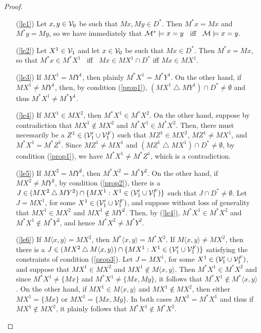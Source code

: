 \documentclass{fundam}
\begin{document}
\begin{proof}
\begin{itemize}
\item [(\ref{le1})] Let $x,y \in {\cal V}_{0}$ be such that $Mx, My
\in D^{*}$.  Then $M^{*}x = Mx$ and $M^{*}y = My$, so we have
immediately that ${\cal M}^{*} \models x = y$ ~iff~ ${\cal M} \models x
= y$.

\item [(\ref{le2})] Let $X^1 \in {\cal V}_{1}$ and let $x \in {\cal
V}_{0}$ be such that $Mx \in D^{*}$.  Then $M^{*}x = Mx$, so that
$M^{*}x \in M^{*}X^1$ ~iff~ $Mx \in MX^1 \cap D^{*}$ iff $Mx \in MX^1$.

\item [(\ref{le3})] If $MX^1 = MY^1$, then plainly $M^{*}X^1 =
M^{*}Y^1$.  On the other hand, if $MX^1 \neq MY^1$, then, by condition
(\ref{prop1}), $(MX^1 \bigtriangleup MY^1) \cap D^{*} \neq \emptyset$ and thus
$M^{*}X^1 \neq M^{*}Y^1$.

\item [(\ref{le4})] If $MX^1 \in MX^2$, then $M^*X^1 \in M^*X^2$.  On
the other hand, suppose by contradiction that $MX^1 \notin MX^2$ and
$M^*X^1 \in M^*X^2$.  Then, there must necessarily be a $Z^1 \in
({\cal V}_{1}' \cup {\cal V}_{1}^{F})$ such that $MZ^1 \in MX^2$,
$MZ^1 \neq MX^1$, and $M^* X^1 = M^* Z^1$.  Since $MZ^1 \neq MX^1$ and
$(MZ^1 \bigtriangleup MX^1) \cap D^{*} \neq \emptyset$, by condition
(\ref{prop1}), we have $M^* X^1 \neq M^* Z^1$, which is a
contradiction.

\item [(\ref{le5})] If $MX^2 = MY^2$, then $M^* X^2 = M^* Y^2$.  On
the other hand, if $MX^2 \neq MY^2$, by condition (\ref{prop2}), there
is a $J \in (MX^2 \bigtriangleup MY^2) \cap \{MX^1 : X^1 \in ({\cal
V}_{1}'\cup {\cal V}_{1}^{F})\}$ such that $J \cap D^* \neq
\emptyset$.  Let $J = MX^1$, for some $X^1 \in ({\cal V}_{1}'\cup
{\cal V}_{1}^{F})$, and suppose without loss of generality that $MX^1
\in MX^2$ and $MX^1 \notin MY^2$.  Then, by (\ref{le4}), $M^*X^1 \in
M^* X^2$ and $M^* X^1 \notin M^* Y^2$, and hence $M^* X^2 \neq M^*
Y^2$.

\item [(\ref{le6})] If $M\langle x,y \rangle = MX^2$, then $M^*
\langle x,y \rangle = M^* X^2$.  If $M\langle x,y \rangle \neq MX^2$,
then there is a $J \in (MX^2 \bigtriangleup M\langle x,y \rangle) \cap
\{MX^1 : X^1 \in ({\cal V}_{1}' \cup {\cal V}_{1}^{F})\}$ satisfying
the constraints of condition (\ref{prop3}).  Let $J = MX^1$, for some
$X^1 \in ({\cal V}_{1}'\cup {\cal V}_{1}^{F})$, and suppose that $MX^1
\in MX^2$ and $MX^1 \notin M\langle x,y\rangle$.  Then $M^*X^1 \in
M^*X^2$ and since $M^*X^1 \neq \{Mx\}$ and $M^*X^1 \neq \{Mx,My\}$, it
follows that $M^*X^1 \notin M^*\langle x,y \rangle$.  On the other
hand, if $MX^1 \in M\langle x,y\rangle$ and $MX^1 \notin MX^2$, then
either $MX^1 = \{Mx\}$ or $MX^1 = \{Mx,My\}$.  In both cases $MX^1 =
M^*X^1$ and thus if $MX^1 \notin MX^2$, it plainly follows that
$M^*X^1 \notin M^*X^2$.


\end{itemize}
\end{proof}
\end{document}
